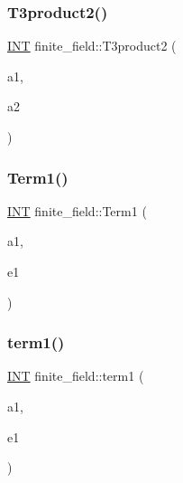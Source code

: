 \mbox{\label{classfinite__field_a3ffdab7c590fc706488fd56ecd87c7a1}} 
\subsubsection{\texorpdfstring{T3product2()}{T3product2()}}
{\footnotesize\ttfamily \mbox{\hyperlink{galois_8h_a09fddde158a3a20bd2dcadb609de11dc}{I\+NT}} finite\+\_\+field\+::\+T3product2 (\begin{DoxyParamCaption}\item[{\mbox{\hyperlink{galois_8h_a09fddde158a3a20bd2dcadb609de11dc}{I\+NT}}}]{a1,  }\item[{\mbox{\hyperlink{galois_8h_a09fddde158a3a20bd2dcadb609de11dc}{I\+NT}}}]{a2 }\end{DoxyParamCaption})}

\mbox{\label{classfinite__field_a01ece3da0e6408b5e2523bd9f3b2a8ee}} 
\subsubsection{\texorpdfstring{Term1()}{Term1()}}
{\footnotesize\ttfamily \mbox{\hyperlink{galois_8h_a09fddde158a3a20bd2dcadb609de11dc}{I\+NT}} finite\+\_\+field\+::\+Term1 (\begin{DoxyParamCaption}\item[{\mbox{\hyperlink{galois_8h_a09fddde158a3a20bd2dcadb609de11dc}{I\+NT}}}]{a1,  }\item[{\mbox{\hyperlink{galois_8h_a09fddde158a3a20bd2dcadb609de11dc}{I\+NT}}}]{e1 }\end{DoxyParamCaption})}

\mbox{\label{classfinite__field_adb8e50d3f70f20124537ae6961930554}} 
\subsubsection{\texorpdfstring{term1()}{term1()}}
{\footnotesize\ttfamily \mbox{\hyperlink{galois_8h_a09fddde158a3a20bd2dcadb609de11dc}{I\+NT}} finite\+\_\+field\+::term1 (\begin{DoxyParamCaption}\item[{\mbox{\hyperlink{galois_8h_a09fddde158a3a20bd2dcadb609de11dc}{I\+NT}}}]{a1,  }\item[{\mbox{\hyperlink{galois_8h_a09fddde158a3a20bd2dcadb609de11dc}{I\+NT}}}]{e1 }\end{DoxyParamCaption})}

